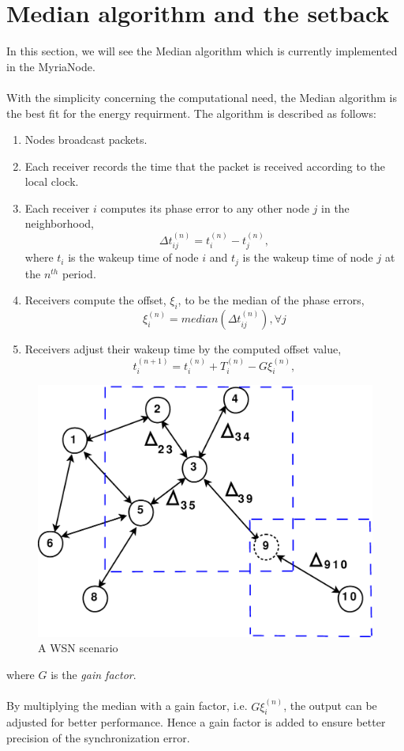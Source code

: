 \documentclass[a4paper,10pt]{report}
\begin{document}
\section{\textbf{Median algorithm and the setback}} In this section, we will see the Median algorithm which is
currently implemented in the MyriaNode. \paragraph*{}
With the simplicity concerning the computational need, the Median algorithm is the best fit for the energy requirment. The algorithm is described as follows:
\begin{enumerate}
\item Nodes broadcast packets.
\item Each receiver records the time that the packet is received according to the local clock.
\item Each receiver $i$ computes its phase error to any other node $j$ in the neighborhood,
\begin{equation}
\Delta t_{ij}^{(n)} = t_i^{(n)} - t_j^{(n)} , \label{pha}
\end{equation}
where $t_i$ is the wakeup time of node $i$ and $t_j$ is the wakeup
time of node $j$ at the $n^{th}$ period.
\item Receivers compute the offset, $\xi_i$, to be the median of the phase errors,
\begin{equation}
\xi_i^{(n)} = median(\Delta t_{ij}^{(n)}) , \forall j
\end{equation}
\item Receivers adjust their wakeup time by the computed offset value,
\begin{equation}
t_{i}^{(n+1)} = t_i^{(n)} + T_i^{(n)} - G\xi_i^{(n)},
\end{equation}
\end{enumerate}
\begin{figure}
\centering
\includegraphics[width=0.5 \textwidth]{node_field}
\caption{A WSN scenario} \label{wsn}
\end{figure}
where $G$ is the \textit{gain factor}. \paragraph*{}
By multiplying the median with a gain factor, i.e. $G\xi_i^{(n)}$, the output can be adjusted for better performance. Hence a gain factor is added to ensure better precision of the synchronization error.
\end{document}
